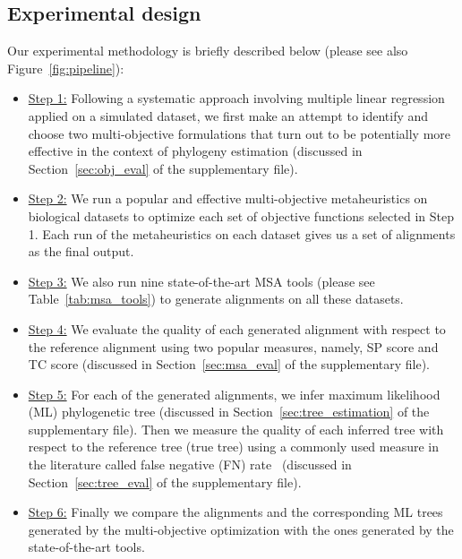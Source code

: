 \subsection{Experimental design}
Our experimental methodology is briefly described below (please see also Figure~\ref{fig:pipeline}):
\begin{itemize}
	\item \underline{Step 1:} Following a systematic approach involving multiple linear regression applied on a simulated dataset, we first make an attempt to identify and choose two multi-objective formulations that turn out to be potentially more effective in the context of phylogeny estimation (discussed in Section~\ref{sec:obj_eval} of the supplementary file). 
	\item \underline{Step 2:} We run a popular and effective multi-objective metaheuristics on biological datasets to optimize each set of objective functions selected in Step 1. Each run of the metaheuristics on each dataset gives us a set of alignments as the final output. 
	\item \underline{Step 3:} We also run nine state-of-the-art MSA tools (please see Table~\ref{tab:msa_tools}) to generate alignments on all these datasets.
	\item \underline{Step 4:} We evaluate the quality of each generated alignment with respect to the reference alignment using two popular measures, namely, SP score and TC score (discussed in Section~\ref{sec:msa_eval} of the supplementary file). 
	\item \underline{Step 5:} For each of the generated alignments, we infer maximum likelihood (ML) phylogenetic tree (discussed in Section~\ref{sec:tree_estimation} of the supplementary file). Then we measure the quality of each inferred tree with respect to the reference tree (true tree) using a commonly used measure in the literature called false negative (FN) rate~\citep{warnow2017computational} (discussed in Section~\ref{sec:tree_eval} of the supplementary file).
	\item \underline{Step 6:} Finally we compare the alignments and the corresponding ML trees generated by the multi-objective optimization with the ones generated by the state-of-the-art tools. %
\end{itemize}

